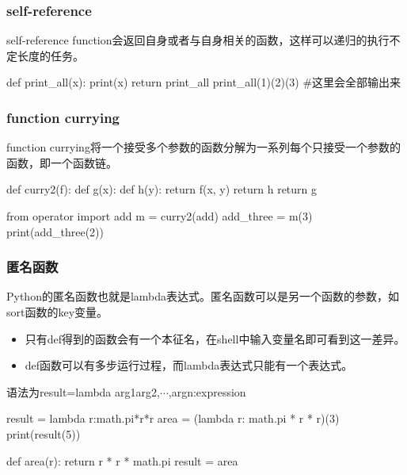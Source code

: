 \documentclass{article}
\begin{document}
      \subsubsection{self-reference}
        self-reference function会返回自身或者与自身相关的函数，这样可以递归的执行不定长度的任务。
        \begin{codeblock}[language=python, caption={self-reference}]
        def print_all(x):
          print(x)
          return print_all
        print_all(1)(2)(3) #这里会全部输出来
        \end{codeblock}

      \subsubsection{function currying}
        function currying将一个接受多个参数的函数分解为一系列每个只接受一个参数的函数，即一个函数链。
        \begin{codeblock}[language=python, caption={function currying}]
          def curry2(f):
            def g(x):
              def h(y):
                return f(x, y)
              return h
            return g
            
          from operator import add
          m = curry2(add)
          add_three = m(3)
          print(add_three(2))
        \end{codeblock}
    
      \subsubsection{匿名函数}
        Python的匿名函数也就是lambda表达式。匿名函数可以是另一个函数的参数，如sort函数的key变量。

        \begin{itemize}
          \item 只有def得到的函数会有一个本征名，在shell中输入变量名即可看到这一差异。
          \item def函数可以有多步运行过程，而lambda表达式只能有一个表达式。
        \end{itemize}

        语法为result=lambda \lbrack arg1\lbrack arg2,$\cdots$,argn\rbrack \rbrack:expression
        \begin{codeblock}[language=python, caption={lambda function}]
          result = lambda r:math.pi*r*r
          area = (lambda r: math.pi * r * r)(3)
          print(result(5))

          def area(r):
            return r * r * math.pi
          result = area
        \end{codeblock}
\end{document}
